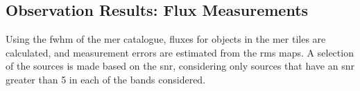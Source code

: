 





\subsection{Observation Results: Flux Measurements}
Using the \gls{fwhm} of the \gls{mer} catalogue, fluxes for objects in the \gls{mer} tiles are calculated, and measurement errors are estimated from the \gls{rms} maps. A selection of the sources is made based on the \gls{snr}, considering only sources that have an \gls{snr} greater than 5 in each of the bands considered. 


